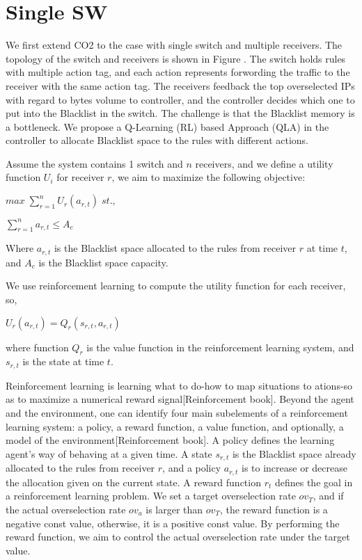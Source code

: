 \documentclass[a4paper,10pt]{article}
\title{}
\author{}
\begin{document}
\maketitle

\section{Single SW}
  We first extend CO2 to the case with single switch and multiple receivers. The topology of the switch and receivers is shown in Figure {}. The switch holds rules with multiple action tag, and each action represents forwording the traffic to the receiver with the same action tag. The receivers feedback the top overselected IPs with regard to bytes volume to controller, and the controller decides which one to put into the Blacklist in the switch. The challenge is that the Blacklist memory is a bottleneck. We propose a Q-Learning (RL) based Approach (QLA) in the controller to allocate Blacklist space to the rules with different actions.

  Assume the system contains 1 switch and $n$ receivers, and we define a utility function $U_i$ for receiver $r$, we aim to maximize the following objective: %
  
  $max \; \sum_{r = 1}^{n} U_r(a_{r,t})\;st.,$
  
  $\sum_{r = 1}^{n}a_{r,t} \leq A_c$
  
  Where $a_{r,t}$ is the Blacklist space allocated to the rules from receiver $r$ at time $t$, and $A_c$ is the Blacklist space capacity.
  
  We use reinforcement learning to compute the utility function for each receiver, so,
  
  $U_r(a_{r,t}) = Q_r(s_{r,t}, a_{r,t})$
  
  where function $Q_r$ is the value function in the reinforcement learning system, and $s_{r,t}$ is the state at time $t$.
  
  Reinforcement learning is learning what to do-how to map situations to ations-so as to maximize a numerical reward signal[Reinforcement book]. Beyond the agent and the environment, one can identify four main subelements of a reinforcement learning system: a policy, a reward function, a value function, and optionally, a model of the environment[Reinforcement book]. 
  A policy defines the learning agent's way of behaving at a given time. A state $s_{r,t}$ is the Blacklist space already allocated to the rules from receiver $r$, and a policy $a_{r,t}$ is to increase or decrease the allocation given on the current state.
  A reward function $r_t$ defines the goal in a reinforcement learning problem. We set a target overselection rate $ov_T$, and if the actual overselection rate $ov_a$ is larger than $ov_T$, the reward function is a negative const value, otherwise, it is a positive const value. By performing the reward function, we aim to control the actual overselection rate under the target value.
  
\end{document}
